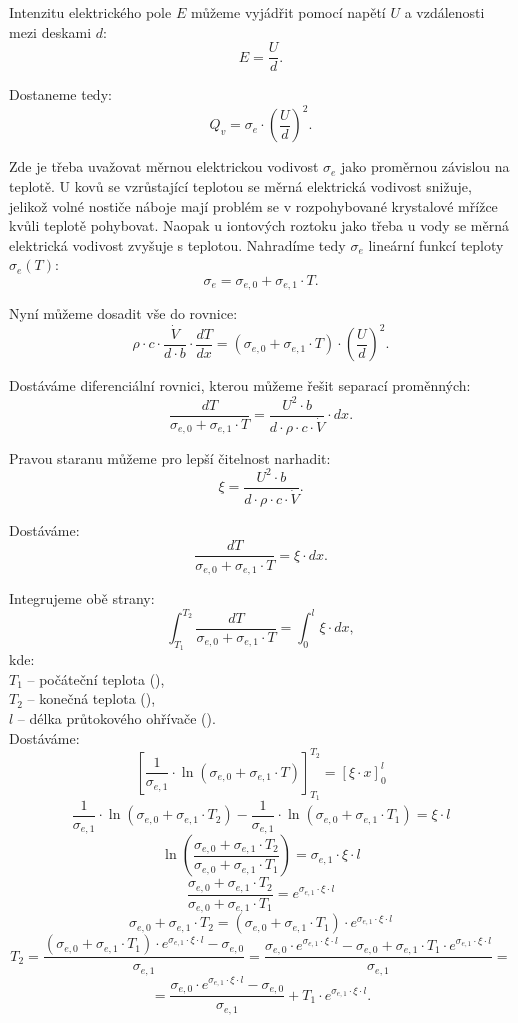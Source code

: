 \documentclass{article}
\begin{document}
Intenzitu elektrického pole $E$ můžeme vyjádřit pomocí napětí $U$ a vzdálenosti mezi deskami $d$:
$$
    E = \frac{U}{d}.
$$

Dostaneme tedy:
$$
    Q_v = \sigma_e \cdot \left( \frac{U}{d} \right)^2.
$$

Zde je třeba uvažovat měrnou elektrickou vodivost $\sigma_e$ jako proměrnou závislou na teplotě. U kovů se vzrůstající teplotou se měrná elektrická vodivost snižuje, jelikož volné nostiče náboje mají problém se v rozpohybované krystalové mřížce kvůli teplotě pohybovat. Naopak u iontových roztoku jako třeba u vody se měrná elektrická vodivost zvyšuje s teplotou. Nahradíme tedy $\sigma_e$ lineární funkcí teploty $\sigma_e(T)$:
$$
    \sigma_e = \sigma_{e,0} + \sigma_{e,1} \cdot T.
$$

Nyní můžeme dosadit vše do rovnice:
$$
    \rho \cdot c \cdot \frac{\dot{V}}{d \cdot b} \cdot \frac{dT}{dx} = \left( \sigma_{e,0} + \sigma_{e,1} \cdot T \right) \cdot \left( \frac{U}{d} \right)^2.
$$

Dostáváme diferenciální rovnici, kterou můžeme řešit separací proměnných:
$$
    \frac{dT}{\sigma_{e,0} + \sigma_{e,1} \cdot T} = \frac{U^2 \cdot b}{d \cdot \rho \cdot c \cdot \dot{V}} \cdot dx.
$$

Pravou staranu můžeme pro lepší čitelnost narhadit:
$$
    \xi = \frac{U^2 \cdot b}{d \cdot \rho \cdot c \cdot \dot{V}}.
$$

Dostáváme:
$$
    \frac{dT}{\sigma_{e,0} + \sigma_{e,1} \cdot T} = \xi \cdot dx.
$$

Integrujeme obě strany:
$$
    \int_{T_1}^{T_2} \frac{dT}{\sigma_{e,0} + \sigma_{e,1} \cdot T} = \int_{0}^{l} \xi \cdot dx,
$$
kde:\\
$T_1$ -- počáteční teplota (\ueqK),\\
$T_2$ -- konečná teplota (\ueqK),\\
$l$ -- délka průtokového ohřívače (\ueqM).\\

Dostáváme:
$$
    \left[ \frac{1}{\sigma_{e,1}} \cdot \ln \left( \sigma_{e,0} + \sigma_{e,1} \cdot T \right) \right]_{T_1}^{T_2} = \left[ \xi \cdot x \right]_0^l
$$
$$
    \frac{1}{\sigma_{e,1}} \cdot \ln \left( \sigma_{e,0} + \sigma_{e,1} \cdot T_2 \right) - \frac{1}{\sigma_{e,1}} \cdot \ln \left( \sigma_{e,0} + \sigma_{e,1} \cdot T_1 \right) = \xi \cdot l
$$
$$
    \ln \left( \frac{\sigma_{e,0} + \sigma_{e,1} \cdot T_2}{\sigma_{e,0} + \sigma_{e,1} \cdot T_1} \right) = \sigma_{e,1} \cdot \xi \cdot l
$$
$$
    \frac{\sigma_{e,0} + \sigma_{e,1} \cdot T_2}{\sigma_{e,0} + \sigma_{e,1} \cdot T_1} = e^{\sigma_{e,1} \cdot \xi \cdot l}
$$
$$
    \sigma_{e,0} + \sigma_{e,1} \cdot T_2 = \left( \sigma_{e,0} + \sigma_{e,1} \cdot T_1 \right) \cdot e^{\sigma_{e,1} \cdot \xi \cdot l}
$$
$$
    T_2 = \frac{\left( \sigma_{e,0} + \sigma_{e,1} \cdot T_1 \right) \cdot e^{\sigma_{e,1} \cdot \xi \cdot l} - \sigma_{e,0}}{\sigma_{e,1}} = \frac{\sigma_{e,0} \cdot e^{\sigma_{e,1} \cdot \xi \cdot l} - \sigma_{e,0} + \sigma_{e,1} \cdot T_1 \cdot e^{\sigma_{e,1} \cdot \xi \cdot l}}{\sigma_{e,1}} =
$$
$$
    = \frac{\sigma_{e,0} \cdot e^{\sigma_{e,1} \cdot \xi \cdot l} - \sigma_{e,0}}{\sigma_{e,1}} + T_1 \cdot e^{\sigma_{e,1} \cdot \xi \cdot l}.
$$
\end{document}

